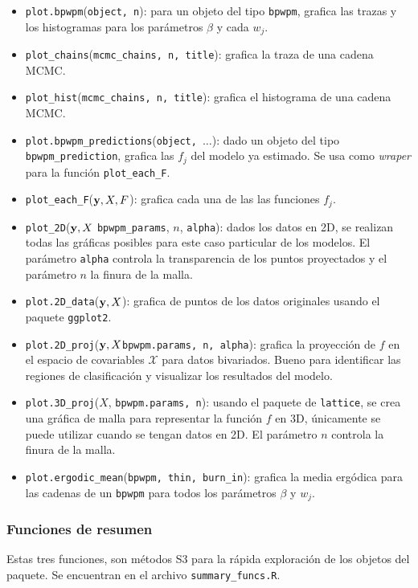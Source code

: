 \documentclass[../../Main/Main.tex]{subfiles}
\begin{document}
\begin{itemize}[label = {}]
	\item \verb|plot.bpwpm|(\verb|object, n|): para un objeto del tipo \verb|bpwpm|, grafica las trazas y los histogramas para los parámetros $\beta$ y cada $w_j$. 
	\item \verb|plot_chains|(\verb|mcmc_chains, n, title|): grafica la traza de una cadena MCMC.
	\item \verb|plot_hist|(\verb|mcmc_chains, n, title|): grafica el histograma de una cadena MCMC.  
	\item \verb|plot.bpwpm_predictions|(\verb|object, |$\ldots$): dado un objeto del tipo \verb|bpwpm_prediction|, grafica las $f_j$ del modelo ya estimado. Se usa como \textit{wraper} para la función \verb|plot_each_F|. 
	\item \verb|plot_each_F|($\mathbf{y}, X, F$): grafica cada una de las las funciones $f_j$. 
	\item \verb|plot_2D|($\mathbf{y}, X$ \verb|bpwpm_params|, $n$, \verb|alpha|): dados los datos en 2D, se realizan todas las gráficas posibles para este caso particular de los modelos. El parámetro \verb|alpha| controla la transparencia de los puntos proyectados y el parámetro $n$ la finura de la malla. 
	\item \verb|plot.2D_data|($\mathbf{y}, X$): grafica de puntos de los datos originales usando el paquete \verb|ggplot2|.
	\item \verb|plot.2D_proj|($\mathbf{y}, X$\verb|bpwpm.params, n, alpha|): grafica la proyección de $f$ en el espacio de covariables $\mathcal{X}$ para datos bivariados. Bueno para identificar las regiones de clasificación y visualizar los resultados del modelo.
	\item \verb|plot.3D_proj|($X$, \verb|bpwpm.params, n|): usando el paquete de \verb|lattice|, se crea una gráfica de malla para representar la función $f$ en 3D, únicamente se puede utilizar cuando se tengan datos en 2D. El parámetro $n$ controla la finura de la malla. 
	\item \verb|plot.ergodic_mean|(\verb|bpwpm, thin, burn_in|): grafica la media ergódica para las cadenas de un \verb|bpwpm| para todos los parámetros $\beta$ y $w_j$.
\end{itemize}

\subsubsection*{Funciones de resumen}
Estas tres funciones, son métodos S3 para la rápida exploración de los objetos del paquete. Se encuentran en el archivo \verb|summary_funcs.R|.
\end{document}
